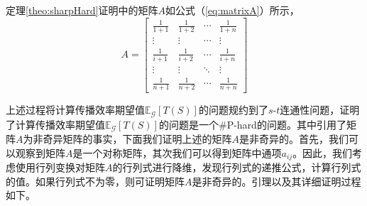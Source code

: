 定理\ref{theo:sharpHard}证明中的矩阵$A$如公式（\ref{eq:matrixA}）所示，
\begin{equation}
\label{eq:matrixA}
	A = 
    \begin{bmatrix}
    \frac{1}{1+1} & \frac{1}{1+2} & \cdots & \frac{1}{1+n} \\
    \vdots & \vdots & \cdots & \vdots \\
    \frac{1}{i+1} & \frac{1}{i+2} & \cdots & \frac{1}{i+n} \\
    \vdots & \vdots & \ddots & \vdots \\
    \frac{1}{n+1} & \frac{1}{n+2} & \cdots & \frac{1}{n+n}
    \end{bmatrix}
\end{equation}

上述过程将计算传播效率期望值$\mathbb{E}_\mathcal{G}\left[T\left(S\right)\right]$的问题规约到了$s$-$t$连通性问题，证明了计算传播效率期望值$\mathbb{E}_\mathcal{G}\left[T\left(S\right)\right]$的问题是一个\#P-hard的问题。其中引用了矩阵$A$为非奇异矩阵的事实，下面我们证明上述的矩阵$A$是非奇异的。首先，我们可以观察到矩阵$A$是一个对称矩阵，其次我们可以得到矩阵中通项$a_{ij}$。因此，我们考虑使用行列变换对矩阵$A$的行列式进行降维，发现行列式的递推公式，计算行列式的值。如果行列式不为零，则可证明矩阵$A$是非奇异的。引理以及其详细证明过程如下。

